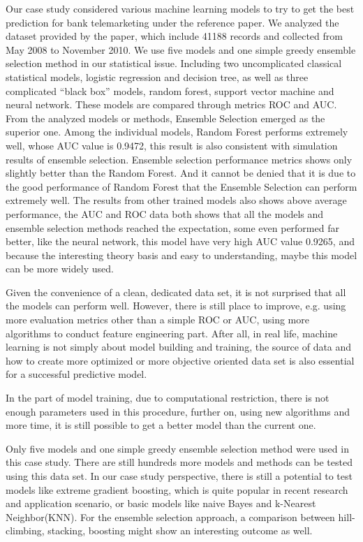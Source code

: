 \documentclass[12pt, a4paper, bibliography=totoc, english]{scrartcl}
\begin{document}
Our case study considered various machine learning models to try to get the best prediction for bank telemarketing under the reference paper. We analyzed the dataset provided by the paper, which include 41188 records and collected from May 2008 to November 2010. We use five models and one simple greedy ensemble selection method in our statistical issue. Including two uncomplicated classical statistical models, logistic regression and decision tree, as well as three complicated ``black box'' models, random forest, support vector machine and neural network. These models are compared through metrics ROC and AUC. From the analyzed models or methods, Ensemble Selection emerged as the superior one. Among the individual models, Random Forest performs extremely well, whose AUC value is 0.9472, this result is also consistent with simulation results of ensemble selection. Ensemble selection performance metrics shows only slightly better than the Random Forest. And it cannot be denied that it is due to the good performance of Random Forest that the Ensemble Selection can perform extremely well. The results from other trained models also shows above average performance, the AUC and ROC data both shows that all the models and ensemble selection methods reached the expectation, some even performed far better, like the neural network, this model have very high AUC value 0.9265, and because the interesting theory basis and easy to understanding, maybe this model can be more widely used.

Given the convenience of a clean, dedicated data set, it is not surprised that all the models can perform well. However, there is still place to improve, e.g. using more evaluation metrics other than a simple ROC or AUC, using more algorithms to conduct feature engineering part. After all, in real life, machine learning is not simply about model building and training, the source of data and how to create more optimized or more objective oriented data set is also essential for a successful predictive model.

In the part of model training, due to computational restriction, there is not enough parameters used in this procedure, further on, using new algorithms and more time, it is still possible to get a better model than the current one.

Only five models and one simple greedy ensemble selection method were used in this case study. There are still hundreds more models and methods can be tested using this data set. In our case study perspective, there is still a potential to test models like extreme gradient boosting, which is quite popular in recent research and application scenario, or basic models like naive Bayes and k-Nearest Neighbor(KNN). For the ensemble selection approach, a comparison between hill-climbing, stacking, boosting might show an interesting outcome as well. 
\end{document}
